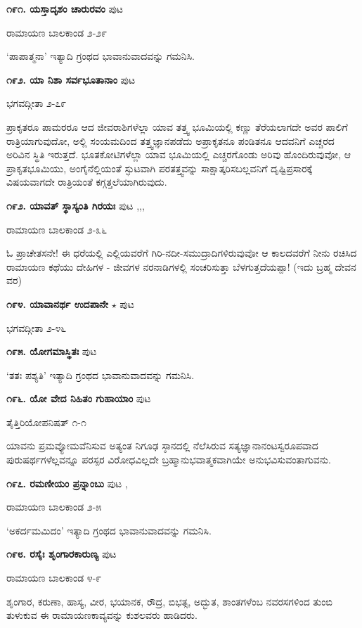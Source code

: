 {\medskip
\noindent\textbf{೧೯೧. ಯಸ್ತಾದೃಶಂ ಚಾರುರವಂ} \hfill ಪುಟ \pageref{250}

\hfill ರಾಮಾಯಣ ಬಾಲಕಾಂಡ ೨-೨೯

`ಪಾಪಾತ್ಮನಾ' ಇತ್ಯಾದಿ ಗ್ರಂಥದ ಭಾವಾನುವಾದವನ್ನು ಗಮನಿಸಿ.

\medskip
\noindent\textbf{೧೯೨. ಯಾ ನಿಶಾ ಸರ್ವಭೂತಾನಾಂ} \hfill ಪುಟ \pageref{138}

\hfill ಭಗವದ್ಗೀತಾ ೨-೭೯

ಪ್ರಾಕೃತರೂ ಪಾಮರರೂ ಆದ ಜೀವರಾಶಿಗಳೆಲ್ಲಾ ಯಾವ ತತ್ತ್ವ ಭೂಮಿಯಲ್ಲಿ ಕಣ್ಣು ತೆರೆಯಲಾಗದೇ ಅವರ ಪಾಲಿಗೆ ರಾತ್ರಿಯಾಗುವುದೋ, ಅಲ್ಲಿ ಸಂಯಮದಿಂದ ತತ್ತ್ವಜ್ಞಾನಪಡೆದು ಅಪ್ರಾಕೃತನೂ ಪಂಡಿತನೂ ಆದವನಿಗೆ ಎಚ್ಚರದ ಅರಿವಿನ ಸ್ಥಿತಿ ಇರುತ್ತದೆ. ಭೂತಕೋಟಿಗಳೆಲ್ಲಾ ಯಾವ ಭೂಮಿಯಲ್ಲಿ ಎಚ್ಚರಗೊಂಡು ಅರಿವು ಹೊಂದಿರುವುವೋ, ಆ ಪ್ರಾಕೃತಭೂಮಿಯು, ಅಂಗೈನೆಲ್ಲಿಯಂತೆ ಸ್ಫುಟವಾಗಿ ಪರತತ್ತ್ವವನ್ನು ಸಾಕ್ಷಾತ್ಕರಿಸಬಲ್ಲವನಿಗೆ ದೃಷ್ಟಿಪ್ರಸಾರಕ್ಕೆ ವಿಷಯವಾಗದೇ ರಾತ್ರಿಯಂತೆ ಕಗ್ಗತ್ತಲೆಯಾಗಿರುವುದು.

\medskip
\noindent\textbf{೧೯೨. ಯಾವತ್ ಸ್ಥಾಸ್ಯಂತಿ ಗಿರಯಃ} \hfill ಪುಟ \pageref{158},\pageref{166},\pageref{208},\pageref{210}

\hfill ರಾಮಾಯಣ ಬಾಲಕಾಂಡ ೨-೩೬

ಓ ಪ್ರಾಚೇತಸನೇ! ಈ ಧರೆಯಲ್ಲಿ ಎಲ್ಲಿಯವರೆಗೆ ಗಿರಿ-ನದೀ-ಸಮುದ್ರಾದಿಗಳಿರುವುವೋ ಆ ಕಾಲದವರೆಗೆ ನೀನು ರಚಿಸಿದ ರಾಮಾಯಣ ಕಥೆಯು ದೇಹಿಗಳ - ಜೀವಗಳ ನರನಾಡಿಗಳಲ್ಲಿ ಸಂಚರಿಸುತ್ತಾ ಬೆಳಗುತ್ತದೆಯಪ್ಪಾ! (ಇದು ಬ್ರಹ್ಮ ದೇವನ ವರ)

\medskip
\noindent\textbf{೧೯೪. ಯಾವಾನರ್ಥ ಉದಪಾನೇ} $\star$ \hfill ಪುಟ \pageref{14}

\hfill ಭಗವದ್ಗೀತಾ ೨-೪೬

\medskip
\noindent\textbf{೧೯೫. ಯೋಗಮಾಸ್ಥಿತಃ} \hfill ಪುಟ \pageref{249}

\hfill `ತತಃ ಪಶ್ಯತಿ' ಇತ್ಯಾದಿ ಗ್ರಂಥದ ಭಾವಾನುವಾದವನ್ನು ಗಮನಿಸಿ.

\medskip
\noindent\textbf{೧೯೬. ಯೋ ವೇದ ನಿಹಿತಂ ಗುಹಾಯಾಂ} \hfill ಪುಟ \pageref{108}

\hfill ತೈತ್ತಿರಿಯೋಪನಿಷತ್ ೧-೧

ಯಾವನು ಪ್ರಮವ್ಯೋಮವೆನಿಸುವ ಅತ್ಯಂತ ನಿಗೂಢ ಸ್ಠಾನದಲ್ಲಿ ನೆಲೆಸಿರುವ ಸತ್ಯಜ್ಞಾನಾನಂಟಸ್ವರೂಪವಾದ ಪುರುಷರ್ಥಗಳೆಲ್ಲವನ್ನೂ ಪರಸ್ಪರ ವಿರೋಧವಿಲ್ಲದೇ ಬ್ರಹ್ಮಾನುಭವಾತ್ಮಕವಾಗಿಯೇ ಅನುಭವಿಸುವಂತಾಗುವನು.

\medskip
\noindent\textbf{೧೯೭. ರಮಣೀಯಂ ಪ್ರನ್ನಾಂಬು} \hfill ಪುಟ \pageref{165},\pageref{211}

\hfill ರಾಮಾಯಣ ಬಾಲಕಾಂಡ ೨-೫

`ಅಕರ್ದಮಮಿದಂ' ಇತ್ಯಾದಿ ಗ್ರಂಥದ ಭಾವಾನುವಾದವನ್ನು ಗಮನಿಸಿ.

\medskip
\noindent\textbf{೧೯೮. ರಸೈಃ ಶೃಂಗಾರಕಾರುಣ್ಯ} \hfill ಪುಟ \pageref{188}

\hfill ರಾಮಾಯಣ ಬಾಲಕಾಂಡ ೪-೯

ಶೃಂಗಾರ, ಕರುಣಾ, ಹಾಸ್ಯ, ವೀರ, ಭಯಾನಕ, ರೌದ್ರ, ಬಿಭತ್ಸ, ಅದ್ಭುತ, ಶಾಂತಗಳೆಂಬ ನವರಸಗಳಿಂದ ತುಂಬಿ ತುಳುಕುವ ಈ ರಾಮಾಯಣಕಾವ್ಯವನ್ನು ಕುಶಲವರು ಹಾಡಿದರು.

}
